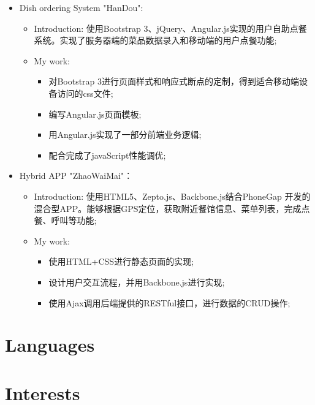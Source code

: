 \documentclass[11pt,a4paper,sans]{moderncv}        %
\begin{document}
{\begin{itemize}
\begin{itemize}
\begin{itemize}
        \item 使用html+css的方式进行移动端优先的响应式设计;
        \item 使用Backbone.js进行前端javaScript业务流程的设计;
        \item 使用Underscore.js进行游戏规则的算法实现;
        \item 使用pushstrem.js结合Nginx配置实现Long polling、Websocket等多种html消息推送，模拟多人在线游戏中的实时通信;
      \end{itemize}
  \end{itemize}
\item Dish ordering System "HanDou":
  \begin{itemize}%
  \item Introduction: 使用Bootstrap 3、jQuery、Angular.js实现的用户自助点餐系统。实现了服务器端的菜品数据录入和移动端的用户点餐功能;
  \item My work:
      \begin{itemize}%
        \item 对Bootstrap 3进行页面样式和响应式断点的定制，得到适合移动端设备访问的css文件;
        \item 编写Angular.js页面模板;
        \item 用Angular.js实现了一部分前端业务逻辑;
        \item 配合完成了javaScript性能调优;
      \end{itemize}
  \end{itemize}
\item Hybrid APP "ZhaoWaiMai"：
  \begin{itemize}%
  \item Introduction: 使用HTML5、Zepto.js、Backbone.js结合PhoneGap 开发的混合型APP。能够根据GPS定位，获取附近餐馆信息、菜单列表，完成点餐、呼叫等功能;
  \item My work:
      \begin{itemize}%
        \item 使用HTML+CSS进行静态页面的实现;
        \item 设计用户交互流程，并用Backbone.js进行实现;
        \item 使用Ajax调用后端提供的RESTful接口，进行数据的CRUD操作;
      \end{itemize}
  \end{itemize}
\end{itemize}}

\section{Languages}

\section{Interests}
\end{document}
